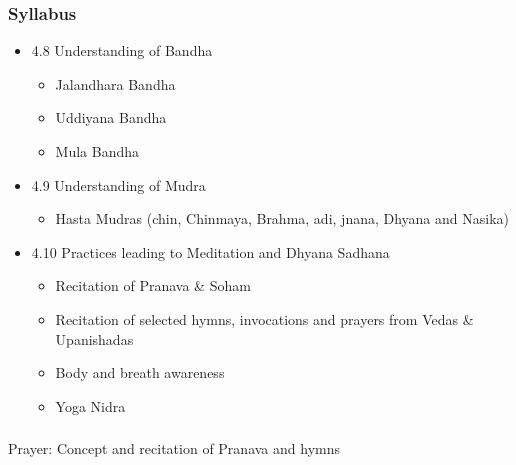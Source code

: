 \begin{frame}[fragile]\frametitle{Syllabus}

\begin{itemize}
\item 4.8  Understanding of Bandha  
	\begin{itemize}
	\item Jalandhara Bandha 
	\item Uddiyana Bandha  
	\item Mula Bandha 
	\end{itemize}

\item 4.9    Understanding of Mudra   
	\begin{itemize}
	\item Hasta Mudras (chin, Chinmaya, Brahma, adi, jnana, Dhyana and Nasika) 
	\end{itemize}
	
\item 4.10  Practices leading to Meditation and Dhyana Sadhana   
	\begin{itemize}
	\item  Recitation of Pranava \& Soham 
	\item  Recitation of selected hymns, invocations and prayers from Vedas \& Upanishadas 
	\item  Body and breath awareness  
	\item  Yoga Nidra 
	\end{itemize}
	
\end{itemize}
\end{frame}

\begin{frame}[fragile]\frametitle{}
\begin{center}
{\Large  Prayer: Concept and recitation of Pranava and hymns}
\end{center}
\end{frame}

